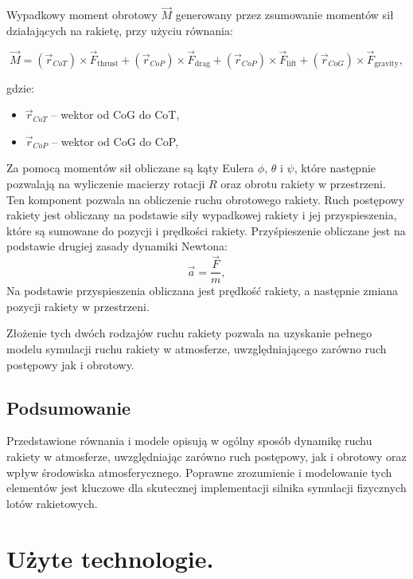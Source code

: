 Wypadkowy moment obrotowy $\vec{M}$ generowany przez zsumowanie momentów sił
działających na rakietę, przy użyciu równania:

\begin{equation}
    \vec{M} = (\vec{r}_{CoT}) \times \vec{F}_\text{thrust} + (\vec{r}_{CoP}) \times \vec{F}_\text{drag} + (\vec{r}_{CoP}) \times \vec{F}_\text{lift} + (\vec{r}_{CoG}) \times \vec{F}_\text{gravity},
    \label{eq:moments_sum}
\end{equation}

gdzie:

\begin{itemize}
    \item $\vec{r}_{CoT}$ -- wektor od CoG do CoT,
    \item $\vec{r}_{CoP}$ -- wektor od CoG do CoP,
\end{itemize}

Za pomocą momentów sił obliczane są kąty Eulera $\phi$, $\theta$ i $\psi$,
które następnie pozwalają na wyliczenie macierzy rotacji $R$ oraz obrotu
rakiety w przestrzeni. Ten komponent pozwala na obliczenie ruchu obrotowego
rakiety.
Ruch postępowy rakiety jest obliczany na podstawie siły wypadkowej rakiety i
jej przyspieszenia, które są sumowane do pozycji i prędkości rakiety.
Przyśpieszenie obliczane jest na podstawie drugiej zasady dynamiki Newtona:
\begin{equation}
    \vec{a} = \frac{\vec{F}}{m},
    \label{eq:acc}
\end{equation}
Na podstawie przyspieszenia obliczana jest prędkość rakiety, a następnie zmiana pozycji rakiety w przestrzeni.

Złożenie tych dwóch rodzajów ruchu rakiety pozwala na uzyskanie pełnego modelu
symulacji ruchu rakiety w atmosferze, uwzględniającego zarówno ruch
postępowy jak i obrotowy.

\subsection{Podsumowanie}
Przedstawione równania i modele opisują w ogólny sposób dynamikę ruchu
rakiety w
atmosferze,
uwzględniając zarówno ruch postępowy, jak i obrotowy oraz wpływ środowiska
atmosferycznego. Poprawne zrozumienie i modelowanie tych elementów jest
kluczowe dla skutecznej implementacji silnika symulacji fizycznych lotów
rakietowych.


\section{Użyte technologie.}\label{sec:uzyte-technologie.}

